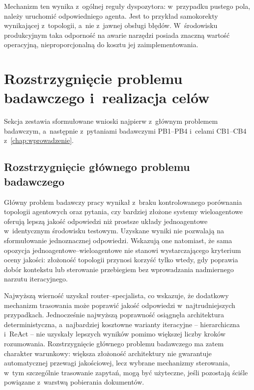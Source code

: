 Mechanizm ten wynika z~ogólnej reguły dyspozytora: w~przypadku pustego pola,
należy uruchomić odpowiedniego agenta. Jest to przykład samokorekty wynikającej
z~topologii, a~nie z~jawnej obsługi błędów. W~środowisku produkcyjnym taka
odporność na awarie narzędzi posiada znaczną wartość operacyjną,
nieproporcjonalną do kosztu jej zaimplementowania.

\section{Rozstrzygnięcie problemu badawczego i~realizacja celów}\label{sec:odpowiedz-na-pytania-badawcze-i-realizacja-celow}

Sekcja zestawia sformułowane wnioski najpierw z~głównym problemem badawczym,
a~następnie z~pytaniami badawczymi PB1--PB4 i~celami CB1--CB4
z~\cref{chap:wprowadzenie}.

\subsection{Rozstrzygnięcie głównego problemu badawczego}\label{subsec:glowny-problem-badawczy}

Główny problem badawczy pracy wynikał z~braku kontrolowanego porównania
topologii agentowych oraz pytania, czy bardziej złożone systemy wieloagentowe
oferują lepszą jakość odpowiedzi niż prostsze układy jednoagentowe
w~identycznym środowisku testowym. Uzyskane wyniki nie pozwalają na
sformułowanie jednoznacznej odpowiedzi. Wskazują one natomiast, że sama
opozycja jednoagentowe--wieloagentowe nie stanowi wystarczającego kryterium
oceny jakości: złożoność topologii przynosi korzyść tylko wtedy, gdy poprawia
dobór kontekstu lub sterowanie przebiegiem bez wprowadzania nadmiernego narzutu
iteracyjnego.

Najwyższą wierność uzyskał router--specjalista, co wskazuje, że dodatkowy
mechanizm trasowania może poprawić jakość odpowiedzi w~najtrudniejszych
przypadkach. Jednocześnie najwyższą poprawność osiągnęła architektura
deterministyczna, a~najbardziej kosztowne warianty iteracyjne -- hierarchiczna
i~ReAct -- nie uzyskały lepszych wyników pomimo większej liczby kroków
rozumowania. Rozstrzygnięcie głównego problemu badawczego ma zatem charakter
warunkowy: większa złożoność architektury nie gwarantuje automatycznej przewagi
jakościowej, lecz wybrane mechanizmy sterowania, w~tym szczególnie trasowanie
zapytań, mogą być użyteczne, jeśli pozostają ściśle powiązane z~warstwą
pobierania dokumentów.

